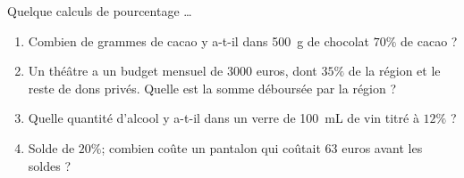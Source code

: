 
\begin{exercice}\label{exo2smath-0211}

    Quelque calculs de pourcentage \ldots
    \begin{enumerate}
        \item
            Combien de grammes de cacao y a-t-il dans \SI{500}{\gram} de chocolat \( 70\%\) de cacao ?
        \item
            Un théâtre a un budget mensuel de \( 3000\) euros, dont \( 35\%\) de la région et le reste de dons privés. Quelle est la somme déboursée par la région ?
        \item
            Quelle quantité d'alcool y a-t-il dans un verre de \SI{100}{\milli\liter} de vin titré à \( 12\%\) ?
        \item
            Solde de \( 20\%\); combien coûte un pantalon qui coûtait \( 63\) euros avant les soldes ?
    \end{enumerate}

\end{exercice}
